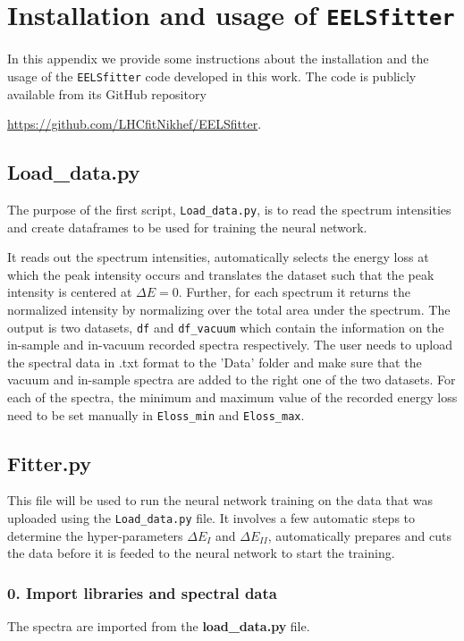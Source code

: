 
\section{Installation and usage of {\tt EELSfitter}}
\label{sec:installation}

In this appendix we provide some instructions about the installation
and the usage of the {\tt EELSfitter} code developed
in this work.
%
The code is publicly available from its GitHub repository
\begin{center}
\url{https://github.com/LHCfitNikhef/EELSfitter}.
\end{center}

\subsection*{Load\_data.py}
The purpose of the first script, {\tt Load\_data.py}, is to read the spectrum
intensities and create dataframes to be used for training the neural network.
%

It reads out the spectrum intensities, automatically selects the energy loss
at which the peak intensity occurs and translates the dataset such that
the peak intensity is centered at $\Delta E =$0. 
%
Further, for each spectrum it returns the normalized intensity by normalizing
over the total area under the spectrum. 
%
The output is two datasets, {\tt df} and {\tt df\_vacuum} which contain the 
information on the in-sample and in-vacuum recorded spectra respectively. 
%
The user needs to upload the spectral data in .txt format to the 'Data' folder
and make sure that the vacuum and in-sample spectra are added to the right one
of the two datasets. 
%
For each of the spectra, the minimum and maximum value of the recorded energy 
loss need to be set manually in {\tt Eloss\_min} and {\tt Eloss\_max}.

\subsection*{Fitter.py}
This file will be used to run the neural network training on the data that was 
uploaded using the {\tt Load\_data.py} file.
%
It involves a few automatic steps to determine the hyper-parameters $\Delta E_I$
and $\Delta E_{II}$, automatically prepares and cuts the data before it is feeded
to the neural network to start the training. 
%
\subsubsection*{0. Import libraries and spectral data}
The spectra are imported from the {\bf load\_data.py} file.

